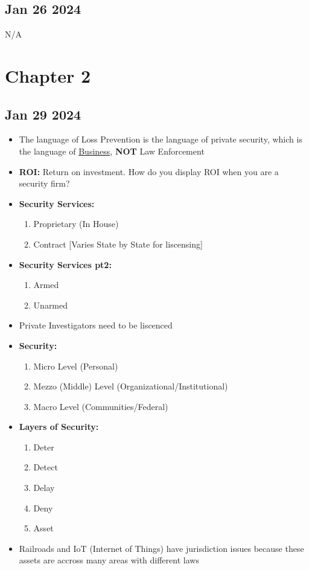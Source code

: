 \documentclass[12pt]{article}
\begin{document}
\subsection*{Jan 26 2024}

N/A

\section*{Chapter 2}

\subsection*{Jan 29 2024}

\begin{itemize}
		  \item The language of Loss Prevention is the language of private security, which is the language of 
					 \underline{Business}, \textbf{NOT} Law Enforcement
		  \item \textbf{ROI:} Return on investment. How do you display ROI when you are a security firm?
		  \item \textbf{Security Services:}
					 \begin{enumerate}
								\item Proprietary (In House) 
								\item Contract [Varies State by State for liscensing]
					 \end{enumerate}
		  \item \textbf{Security Services pt2:}
					 \begin{enumerate}
								\item Armed 
								\item Unarmed
					 \end{enumerate}
		  \item Private Investigators need to be liscenced
		  \item \textbf{Security:} 
					 \begin{enumerate}
								\item Micro Level (Personal)
								\item Mezzo (Middle) Level (Organizational/Institutional)
								\item Macro Level (Communities/Federal)
					 \end{enumerate}
		  \item \textbf{Layers of Security:} 
					 \begin{enumerate}
								\item Deter
								\item Detect
								\item Delay
								\item Deny
								\item Asset
					 \end{enumerate}
		  \item Railroads and IoT (Internet of Things) have jurisdiction issues because these 
					 assets are accross many areas with different laws
\end{itemize}
\end{document}
